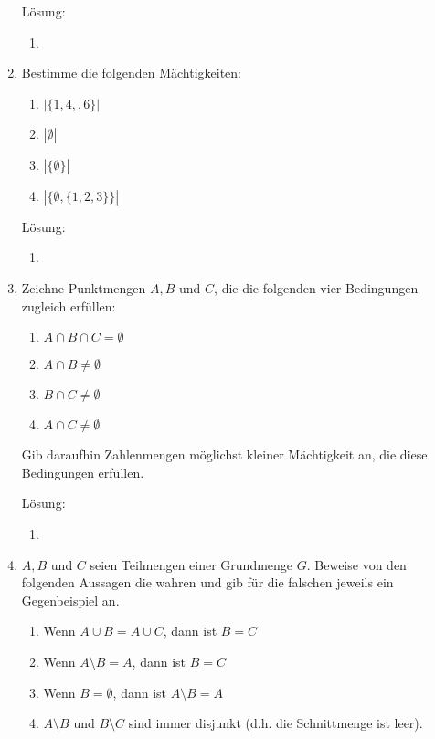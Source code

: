 \documentclass[main.tex]{subfiles}
\begin{document}
\begin{enumerate}
	      Lösung:
	      \begin{enumerate}
		      \item
	      \end{enumerate}
	\item Bestimme die folgenden Mächtigkeiten:
	      \begin{multicols}{2}
		      \begin{enumerate}
			      \item \( |\{1, 4, ,6 \}| \)
			      \item \( |\emptyset| \)
			      \item \( |\{ \emptyset \}| \)
			      \item \( |\{ \emptyset, \{ 1, 2 ,3 \} \}| \)
		      \end{enumerate}
	      \end{multicols}
	      Lösung:
	      \begin{enumerate}
		      \item
	      \end{enumerate}
	\item Zeichne Punktmengen \( A, B \) und \( C \), die die folgenden vier Bedingungen
	      zugleich erfüllen:
	      \begin{multicols}{2}
		      \begin{enumerate}
			      \item \( A \cap B \cap C = \emptyset \)
			      \item \( A \cap B \neq \emptyset \)
			      \item \( B \cap C \neq \emptyset \)
			      \item \( A \cap C \neq \emptyset \)
		      \end{enumerate}
	      \end{multicols}
	      Gib daraufhin Zahlenmengen möglichst kleiner Mächtigkeit an, die diese
	      Bedingungen erfüllen.

	      Lösung:
	      \begin{enumerate}
		      \item
	      \end{enumerate}
	\item \( A, B \) und \( C \) seien Teilmengen einer Grundmenge \( G \).
	      Beweise von den folgenden Aussagen die wahren und gib für die falschen jeweils ein Gegenbeispiel an.
	      \begin{enumerate}
		      \item Wenn \( A \cup B = A \cup C \), dann ist \( B = C \)
		      \item Wenn \( A \setminus B = A \), dann ist \( B = C \)
		      \item Wenn \( B = \emptyset \), dann ist \(  A \setminus B  = A \)
		      \item \( A \setminus B  \) und \( B \setminus C \) sind immer disjunkt
		            (d.h. die Schnittmenge ist leer).
	      \end{enumerate}


\end{enumerate}
\end{document}
